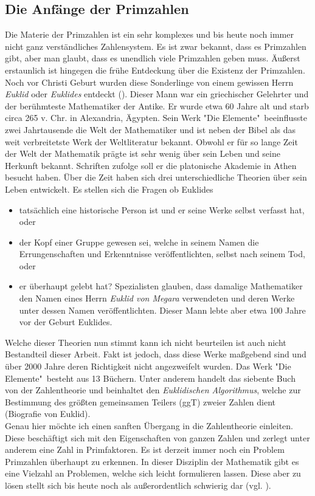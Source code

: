 \documentclass[german,12pt,a4paper]{article}
\begin{document}
\subsection{Die Anfänge der Primzahlen}\label{Die Anfänge der Primzahlen}
Die Materie der Primzahlen ist ein sehr komplexes und bis heute noch immer nicht ganz verständliches Zahlensystem.
Es ist zwar bekannt, dass es Primzahlen gibt, aber man glaubt, dass es unendlich viele Primzahlen geben muss.
Äußerst erstaunlich ist hingegen die frühe Entdeckung über die Existenz der Primzahlen.
Noch vor Christi Geburt wurden diese Sonderlinge von einem gewissen Herrn \textit{Euklid} oder \textit{Euklides} entdeckt (\cite[22]{Remmert1995}).
Dieser Mann war ein griechischer Gelehrter und der berühmteste Mathematiker der Antike.
Er wurde etwa 60 Jahre alt und starb circa 265 v. Chr. in Alexandria, Ägypten.
Sein Werk "Die Elemente"\ beeinflusste zwei Jahrtausende die Welt der Mathematiker und ist neben der Bibel als das weit verbreitetste Werk der Weltliteratur bekannt.
Obwohl er für so lange Zeit der Welt der Mathematik prägte ist sehr wenig über sein Leben und seine Herkunft bekannt.
Schriften zufolge soll er die platonische Akademie in Athen besucht haben.
Über die Zeit haben sich drei unterschiedliche Theorien über sein Leben entwickelt.
Es stellen sich die Fragen ob Euklides\
\begin{itemize}
\item tatsächlich eine historische Person ist und er seine Werke selbst verfasst hat, oder
\item der Kopf einer Gruppe gewesen sei, welche in seinem Namen die Errungenschaften und Erkenntnisse veröffentlichten, selbst nach seinem Tod, oder
\item er überhaupt gelebt hat?
Spezialisten glauben, dass damalige Mathematiker den Namen eines Herrn \textit{Euklid von Megara} verwendeten und deren Werke unter dessen Namen veröffentlichten.
Dieser Mann lebte aber etwa 100 Jahre vor der Geburt Euklides.
\end{itemize}
Welche dieser Theorien nun stimmt kann ich nicht beurteilen ist auch nicht Bestandteil dieser Arbeit.
Fakt ist jedoch, dass diese Werke maßgebend sind und über 2000 Jahre deren Richtigkeit nicht angezweifelt wurden.
Das Werk "Die Elemente"\ besteht aus 13 Büchern.
Unter anderem handelt das siebente Buch von der Zahlentheorie und beinhaltet den \textit{Euklidischen Algorithmus}, welche zur Bestimmung des größten gemeinsamen Teilers (ggT) zweier Zahlen dient (Biografie von Euklid).\\
Genau hier möchte ich einen sanften Übergang in die Zahlentheorie einleiten.
Diese beschäftigt sich mit den Eigenschaften von ganzen Zahlen und zerlegt unter anderem eine Zahl in Primfaktoren.
Es ist derzeit immer noch ein Problem Primzahlen überhaupt zu erkennen. In dieser Disziplin der Mathematik gibt es eine Vielzahl an Problemen, welche sich leicht formulieren lassen.
Diese aber zu lösen stellt sich bis heute noch als außerordentlich schwierig dar (vgl. \cite[13]{Pomerance1996}).
\end{document}
